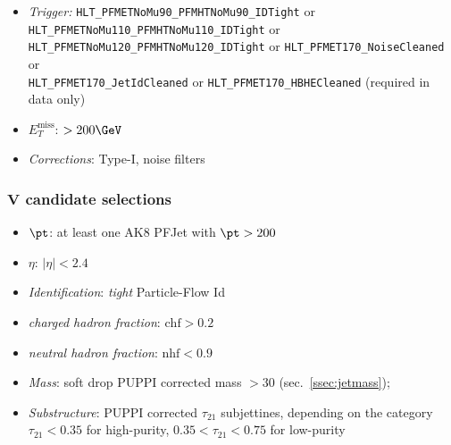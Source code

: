 \begin{itemize}
    \item \textit{Trigger:}  {\tt HLT\_PFMETNoMu90\_PFMHTNoMu90\_IDTight} or {\tt HLT\_PFMETNoMu110\_PFMHTNoMu110\_IDTight} or {\tt HLT\_PFMETNoMu120\_PFMHTNoMu120\_IDTight} or {\tt HLT\_PFMET170\_NoiseCleaned} or \\ {\tt HLT\_PFMET170\_JetIdCleaned} or {\tt HLT\_PFMET170\_HBHECleaned} (required in data only)
    \item \textit{${E_T^{\text{miss}}}$}: $>200 \GeV$
    \item \textit{Corrections}: Type-I, noise filters  
\end{itemize}

\subsubsection{$\mathbf{V}$ candidate selections}

\begin{itemize}
    \item \textit{$\pt$}: at least one AK8 PFJet with $\pt>200$ \GeV
    \item \textit{$\eta$}: $|\eta|<2.4$
    \item \textit{Identification}: \emph{tight} Particle-Flow Id
    \item \textit{charged hadron fraction}: $\text{chf}>0.2$
    \item \textit{neutral hadron fraction}: $\text{nhf}<0.9$
    \item \textit{Mass}: soft drop PUPPI corrected mass $>30$ \GeV (sec.~\ref{ssec:jetmass});
    \item \textit{Substructure}: PUPPI corrected $\tau_{21}$ subjettines, depending on the category {\bf $\tau_{21} < 0.35$} for high-purity, {\bf $ 0.35 < \tau_{21} < 0.75$} for low-purity
\end{itemize}



